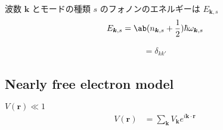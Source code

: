\documentclass[uplatex,dvipdfmx,a4paper,11pt]{jlreq}
\newcommand{\rr}{\bm{r}}
\newcommand{\kk}{\bm{k}}
\numberwithin{equation}{section}
\theoremstyle{definition}
\begin{document}
波数 $\kk$ とモードの種類 $s$ のフォノンのエネルギーは $E_{\kk,s}$
\begin{align}
  E_{\kk,s} = \ab(n_{\kk,s} + \frac{1}{2})\hbar\omega_{\kk,s}
\end{align}

\begin{align}
  [a_k, a_{k'}^\dagger] = \delta_{kk'}
\end{align}


\subsection{Nearly free electron model}
$V(\rr) \ll 1$
\begin{align}
  V(\rr) & = \sum_{\kk}V_{\kk}e^{i\kk\cdot\rr}
\end{align}
\end{document}
